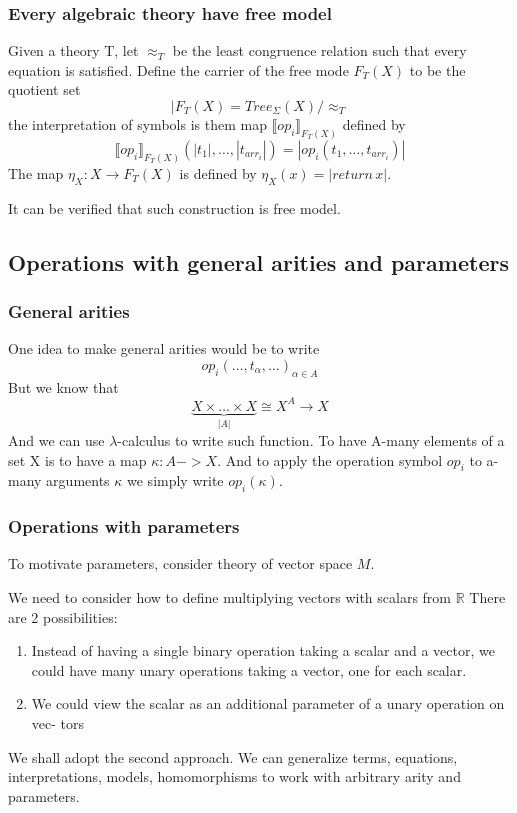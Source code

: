 \documentclass{beamer}
\begin{document}
\begin{frame}
    \frametitle{Every algebraic theory have free model}
    Given a theory T, let $\approx_T$ be the least congruence relation 
    such that every equation is satisfied.
    Define the carrier of the free mode $F_T(X)$ to be the quotient set
    \[
      |F_T(X) =   Tree_\Sigma(X)/\approx_T
    \] the interpretation of symbols is them map $\llbracket op_i \rrbracket_{F_T(X)}$ defined by
    \[
        \llbracket op_i \rrbracket_{F_T(X)}(|t_1|, \ldots, |t_{arr_i}|) =
        |op_i(t_1, \ldots, t_{arr_i})|   
    \]
    The map $\eta_X : X  \rightarrow  F_T(X)$ is defined by $\eta_X(x) = |return \, x|$.

    It can be verified that such construction is free model.
\end{frame}


    \subsection{Operations with general arities and parameters}
    \begin{frame}
        \frametitle{General arities}
        One idea to make general arities would be to write 
    \[
      op_i(\ldots, t_\alpha, \ldots)_{\alpha \in A}  
    \]
    But we know that 
    \[
      \underbrace{X \times  \ldots \times X}_{|A|} \cong X^A \rightarrow X
    \]
    And we can use $\lambda$-calculus to write such function.
    To have A-many elements of a set X is to have a map $\kappa : A -> X$.
    And to apply the operation symbol $op_i$ to a-many arguments $\kappa$ we simply write $op_i(\kappa)$.

    \end{frame}

    \begin{frame}
        \frametitle{Operations with parameters}
        To motivate parameters, consider theory of vector space $M$.

        We need to consider how to define multiplying vectors with scalars from $\mathbb{R}$
       There are 2 possibilities:
       \begin{enumerate}
        \item Instead of having a single binary operation taking a scalar and a vector, we could
        have many unary operations taking a vector, one for each scalar.
        \item We could view the scalar as an additional parameter of a unary operation on vec-
        tors
       \end{enumerate} 
       We shall adopt the second approach. We can generalize terms, equations, interpretations, 
       models, homomorphisms to work with arbitrary arity and parameters. 
    \end{frame}
\end{document}
